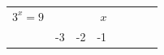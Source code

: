 {{\begin{center}
      \label{m39253*id154772}
      
    \noindent
      \tablelasttail{}
      \begin{xtabular}[t]{|l|l|l|l|l|l|l|l|}\hline
    
    
        
                \begin{math}{3}^{x}=9\end{math}
               &
     \tabularnewline{}
    
    
         &
    
    
        -3 &
    
    
        -2 &
    
    
        -1 &
    

\end{xtabular}
\end{center}}}
